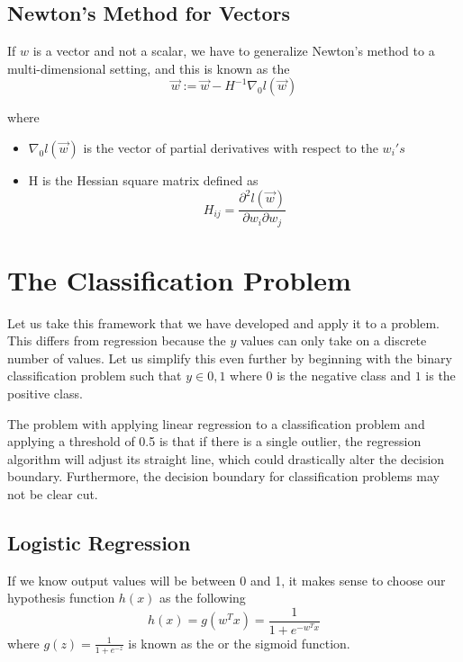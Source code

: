 \documentclass[12pt]{scrartcl}
\begin{document}
\subsection{Newton's Method for Vectors}
\begin{definition}
    If $w$ is a vector and not a scalar, we have
to generalize Newton's method to a multi-dimensional setting,
and this is known as the 
\\ 
\[\vec{w} := \vec{w} - H^{-1}\nabla_0l(\vec{w})\]
\end{definition}
where
\begin{itemize}
    \item $\nabla_0l(\vec{w})$ is the vector of partial derivatives
with respect to the $w_i's$
\item H is the Hessian square matrix defined as 
\[H_{ij} = \frac{\partial^2 l(\vec{w})}{\partial w_i \partial w_j}\]
\end{itemize}

\section{The Classification Problem}

\begin{definition}
Let us take this framework that we have developed and 
apply it to a  problem. This differs from 
regression because the $y$ values can only take on a discrete
number of values. Let us simplify this even further by beginning with the 
binary classification problem such that $y \in 0, 1$
where $0$ is the negative class and $1$ is the 
positive class.  
\end{definition}

\begin{note}
    The problem with applying linear regression to a 
    classification problem and applying a threshold of 0.5 
    is that if there is a single outlier, the regression
    algorithm will adjust its straight line, which could drastically
    alter the decision boundary. Furthermore, the decision
    boundary for classification problems may not be clear cut.
\end{note}

\subsection{Logistic Regression}


\begin{definition}
    If we know output values will be between 0 and 1, 
it makes sense to choose our hypothesis function 
$h(x)$ as the following
\[h(x) = g(w^Tx) = \frac{1}{1 + e^{-w^Tx}}\]
where $g(z) = \frac{1}{1 + e^{-z}}$ is known as 
the  or the sigmoid function.
\end{definition}
\end{document}
